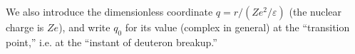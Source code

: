 We also introduce the dimensionless coordinate $q=r/(Ze^2/\varepsilon)$ (the nuclear charge is $Ze$), and write $q_0$ for its value (complex in general) at the ``transition point,'' i.e. at the ``instant of deuteron breakup.''
